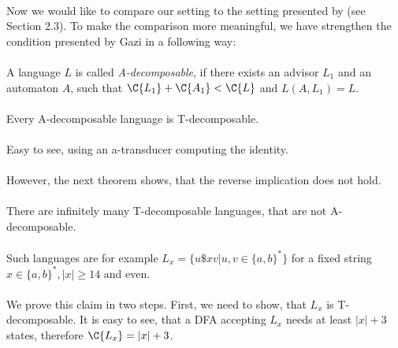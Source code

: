 \paragraph{}
Now we would like to compare our setting to the setting presented by \cite{Gazi} (see Section 2.3). To make the comparison more meaningful, we have strengthen the condition presented by Gazi in a following way:

\paragraph{}
\cdefinicia A language $L$ is called \emph{A-decomposable}, if there exists an advisor $L_1$ and an automaton $A$, such that $\C{L_1} + \C{A_1} < \C{L}$ and $L(A, L_1) = L$.

\paragraph{}
\cveta Every A-decomposable language is T-decomposable.

\paragraph{}
\dokaz Easy to see, using an a-transducer computing the identity. \square

\paragraph{}
However, the next theorem shows, that the reverse implication does not hold.

\paragraph{}
\cveta There are infinitely many T-decomposable languages, that are not A-decomposable.

\paragraph{}
\dokaz Such languages are for example $L_{x} = \{ u\$xv | u,v \in \{ a,b\}^* \}$ for a fixed string $x \in \{ a,b\}^*, |x| \geq 14$ and even.

\paragraph{}
We prove this claim in two steps. First, we need to show, that $L_{x}$ is T-decomposable. It is easy to see, that  a DFA accepting $L_{x}$ needs at least $|x| + 3$ states, therefore $\C{L_x} = |x|+3$.


